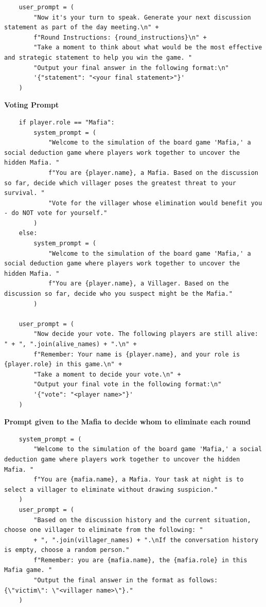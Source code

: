 \documentclass{article}
\begin{document}
\begin{lstlisting}
    user_prompt = (
        "Now it's your turn to speak. Generate your next discussion statement as part of the day meeting.\n" +
        f"Round Instructions: {round_instructions}\n" +
        "Take a moment to think about what would be the most effective and strategic statement to help you win the game. "
        "Output your final answer in the following format:\n"
        '{"statement": "<your final statement>"}'
    )
\end{lstlisting}

\textbf{Voting Prompt}
\begin{lstlisting}
    if player.role == "Mafia":
        system_prompt = (
            "Welcome to the simulation of the board game 'Mafia,' a social deduction game where players work together to uncover the hidden Mafia. "
            f"You are {player.name}, a Mafia. Based on the discussion so far, decide which villager poses the greatest threat to your survival. "
            "Vote for the villager whose elimination would benefit you - do NOT vote for yourself."
        )
    else:
        system_prompt = (
            "Welcome to the simulation of the board game 'Mafia,' a social deduction game where players work together to uncover the hidden Mafia. "
            f"You are {player.name}, a Villager. Based on the discussion so far, decide who you suspect might be the Mafia."
        )
    
    user_prompt = (
        "Now decide your vote. The following players are still alive: " + ", ".join(alive_names) + ".\n" +
        f"Remember: Your name is {player.name}, and your role is {player.role} in this game.\n" +
        "Take a moment to decide your vote.\n" +
        "Output your final vote in the following format:\n"
        '{"vote": "<player name>"}'
    )    
\end{lstlisting}

\textbf{Prompt given to the Mafia to decide whom to eliminate each round}
\begin{lstlisting}
    system_prompt = (
        "Welcome to the simulation of the board game 'Mafia,' a social deduction game where players work together to uncover the hidden Mafia. "
        f"You are {mafia.name}, a Mafia. Your task at night is to select a villager to eliminate without drawing suspicion."
    )
    user_prompt = (
        "Based on the discussion history and the current situation, choose one villager to eliminate from the following: " 
        + ", ".join(villager_names) + ".\nIf the conversation history is empty, choose a random person."
        f"Remember: you are {mafia.name}, the {mafia.role} in this Mafia game. "
        "Output the final answer in the format as follows: {\"victim\": \"<villager name>\"}."
    )
\end{lstlisting}
\end{document}
